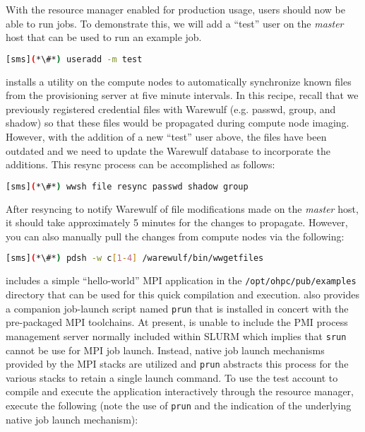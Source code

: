 With the resource manager enabled for production usage, users should now be
able to run jobs.  To demonstrate this, we will add a ``test'' user on the {\em master}
host that can be used to run an example job.

\begin{lstlisting}[language=bash,keywords={}]
[sms](*\#*) useradd -m test
\end{lstlisting}

\Warewulf{} installs a utility on the compute nodes to automatically 
synchronize known files from the provisioning server at five minute intervals. In this
recipe, recall that we previously registered credential files with Warewulf (e.g. passwd,
group, and shadow) so that these files would be propagated during compute node
imaging. However, with the addition of a new ``test'' user above, the files
have been outdated and we need to update the Warewulf database to incorporate
the additions. This resync process can be accomplished as follows:

\begin{lstlisting}[language=bash,keywords={}]
[sms](*\#*) wwsh file resync passwd shadow group
\end{lstlisting}

\begin{center}
\begin{tcolorbox}[]
\small
After resyncing to notify Warewulf of file modifications made on the {\em
master} host, it should take approximately 5 minutes for the changes to
propagate. However, you can also manually pull the changes from compute nodes
via the following:
\begin{lstlisting}[language=bash,keywords={}]
[sms](*\#*) pdsh -w c[1-4] /warewulf/bin/wwgetfiles 
\end{lstlisting}
\end{tcolorbox}
\end{center}


\OHPC{} includes a simple ``hello-world'' MPI application in the
\texttt{/opt/ohpc/pub/examples} directory that can be used for this quick
compilation and execution. \OHPC{} also provides a companion job-launch
script named \texttt{prun} that is installed in concert with the pre-packaged
MPI toolchains. At present, \OHPC{} is unable to include the PMI process management
server normally included within SLURM which implies that \texttt{srun} cannot be
use for MPI job launch. Instead, native job launch mechanisms provided by the
MPI stacks are utilized and \texttt{prun} abstracts this process for the various
stacks to retain a single launch command. To use the test account to compile and execute the
application interactively through the resource manager, execute the following
(note the use of \texttt{prun} and the indication of the underlying native job
launch mechanism):

